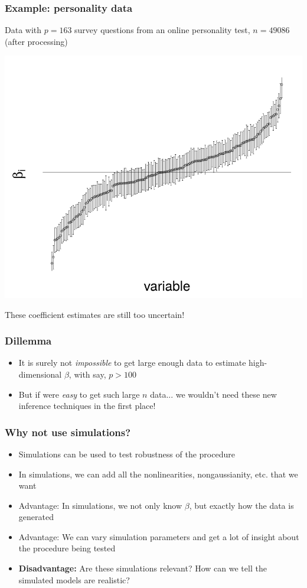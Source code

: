 \documentclass{beamer}
\begin{document}
\begin{frame}
\frametitle{Example: personality data}
Data with $p = 163$ survey questions from an online personality test, $n = 49086$ (after processing)
\begin{center}
\includegraphics[scale = 0.2]{pf16_coefs.png}
\end{center}
These coefficient estimates are still too uncertain!
\end{frame}

\begin{frame}
\frametitle{Dillemma}
\begin{itemize}
\item It is surely not \emph{impossible} to get large enough data to estimate high-dimensional $\beta$, with say, $p > 100$
\item But if were \emph{easy} to get such large $n$ data... we wouldn't need these new inference techniques in the first place!
\end{itemize}
\end{frame}

\begin{frame}
\frametitle{Why not use simulations?}
\begin{itemize}
\item<1> Simulations can be used to test robustness of the procedure
\item<1> In simulations, we can add all the nonlinearities, nongaussianity, etc. that we want
\item<2-> Advantage: In simulations, we not only know $\beta$, but exactly how the data is generated
\item<2-> Advantage: We can vary simulation parameters and get a lot of insight about the procedure being tested
\item<3> \textbf{Disadvantage:} Are these simulations relevant?  How can we tell the simulated models are realistic?
\end{itemize}
\end{frame}
\end{document}
